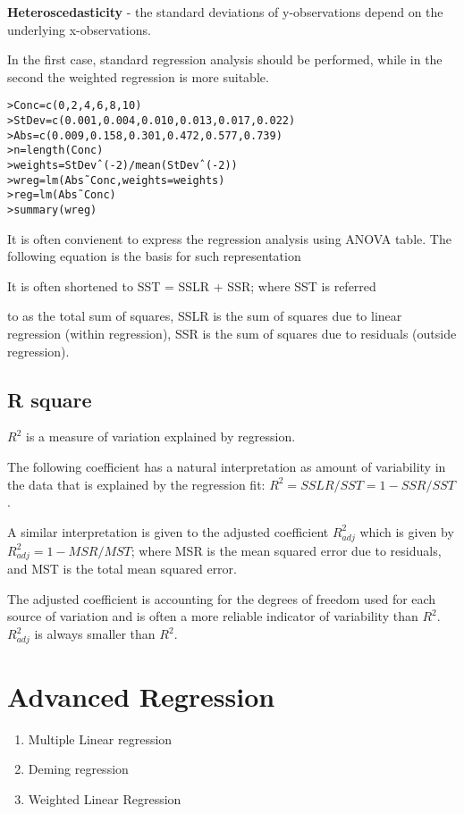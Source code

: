 \textbf{Heteroscedasticity} - the standard deviations of
y-observations depend on the underlying x-observations.

In the first case, standard regression analysis should be
performed, while in the second the weighted regression is more
suitable.

\begin{verbatim}
>Conc=c(0,2,4,6,8,10)
>StDev=c(0.001,0.004,0.010,0.013,0.017,0.022)
>Abs=c(0.009,0.158,0.301,0.472,0.577,0.739)
>n=length(Conc)
>weights=StDevˆ(-2)/mean(StDevˆ(-2))
>wreg=lm(Abs˜Conc,weights=weights)
>reg=lm(Abs˜Conc)
>summary(wreg)
\end{verbatim}


It is often convienent to express the regression analysis using
ANOVA table. The following equation is the basis for such
representation

It is often shortened to SST = SSLR + SSR; where SST is referred

to as the total sum of squares, SSLR is the sum of squares due to
linear regression (within regression), SSR is the sum of squares
due to residuals (outside regression).

\subsection{R square}
$R^2$ is a measure of variation explained by regression.

The following coefficient has a natural interpretation as amount
of variability in the data that is explained by the regression
fit: $R^2 = SSLR/SST = 1 - SSR/SST$.

A similar interpretation is given to the adjusted coefficient
$R^2_{adj}$ which is given by $R^2_{adj} = 1 - MSR/MST $; where
MSR is the mean squared error due to residuals, and MST is the
total mean squared error.

The adjusted coefficient is accounting for the degrees of freedom
used for each source of variation and is often a more reliable
indicator of variability than $R^2$. $R^2_{adj}$ is always smaller
than $R^2$.



\newpage


\section{Advanced Regression}

\begin{enumerate}
	\item Multiple Linear regression
	\item Deming regression
	\item Weighted Linear Regression
\end{enumerate}


